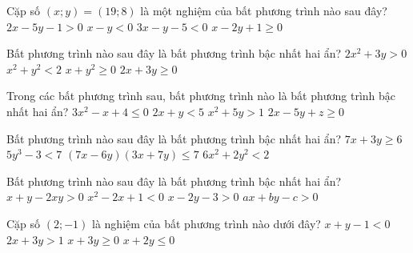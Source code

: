 \begin{ex}%
	Cặp số $(x;y)=(19;8)$ là một nghiệm của bất  phương trình nào sau đây?
	 \choice
		 {$2x-5y-1>0$}
		 {$x-y<0$}
		 {$3x-y-5<0$}
		{\True  $x-2y+1 \ge 0$}
\end{ex}

\begin{ex}%
	Bất phương trình nào sau đây là bất phương trình bậc nhất hai  ẩn?
	\choice 
		 {$2x^2+3y>0$}
		{$x^2+y^2<2$} 
		{$x+y^2\ge 0$} 
		{\True $2x+3y\ge 0$} 
\end{ex}

\begin{ex}%
	Trong các bất phương trình sau, bất phương trình nào là bất phương trình bậc nhất hai ẩn? 
	 \choice
		{$3x^2-x+4\le  0$}
		 {\True $2x+y < 5$}
		{$x^2+5y > 1$} 
		{$2x-5y+z\ge  0$}
\end{ex}

\begin{ex}%
	Bất phương trình nào sau đây là bất phương trình bậc nhất hai  ẩn?
	\choice 
		 {\True $7x+3y\ge 6$}
		 {$5y^3-3<7$}
		 {$(7x-6y)(3x+7y)\le 7$}
		{$6x^2+2y^2<2$} 
\end{ex}

\begin{ex}%
	Bất phương trình  nào sau đây là bất phương trình bậc nhất hai ẩn?
	\choice 
		 {$x+y-2xy > 0$}
		{$x^2-2x+1<  0$}
		 {\True $x-2y-3> 0$}
		{$ax+by-c >  0$}
\end{ex}

\begin{ex}%
	Cặp  số $\left(2;-1\right)$ là nghiệm của bất phương trình nào dưới đây?
	\choice 
		{$x+y-1< 0$} 
		{$2x+3y >  1$}
		 {$x+3y\ge 0$}
		{\True $x+2y\le  0$}
\end{ex}

